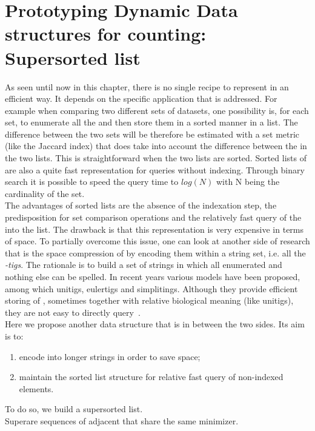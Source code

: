 \section{Prototyping Dynamic Data structures for \kmer counting: Super\kmer sorted list}
\label{sec:skmers}
As seen until now in this chapter, there is no single recipe to represent \kmers in an efficient way. It depends on the specific application that is addressed. For example when comparing two different sets of datasets, one possibility is, for each set, to enumerate all the \kmers and then store them in a sorted manner in a list. The difference between the two sets will be therefore be estimated with a set metric (like the Jaccard index) that does take into account the difference between the \kmers in the two lists. This is straightforward when the two lists are sorted. Sorted lists of \kmers are also a quite fast representation for \kmer queries without indexing. Through binary search it is possible to speed the query time to $log(N)$ with N being the cardinality of the set.\\
The advantages of sorted \kmer lists are the absence of the indexation step, the predisposition for set comparison operations and the relatively fast query of the \kmer into the list. The drawback is that this representation is very expensive in terms of space. To partially overcome this issue, one can look at another side of \kmer research that is the space compression of \kmer by encoding them within a string set, i.e. all the \emph{-tigs}. The rationale is to build a set of strings in which all enumerated \kmers and nothing else can be spelled. In recent years various models have been proposed, among which unitigs, eulertigs and simplitings. Although they provide efficient storing of \kmers, sometimes together with relative biological meaning (like unitigs), they are not easy to directly query~\cite{marchet2024kmersets}.\\
Here we propose another data structure that is in between the two sides. Its aim is to:
\begin{enumerate}
	\item encode \kmers into longer strings in order to save space;
	\item maintain the sorted list structure for relative fast query of non-indexed elements.
\end{enumerate}
To do so, we build a super\kmer sorted list.\\
Super\kmers are sequences of adjacent \kmers that share the same minimizer. \\
